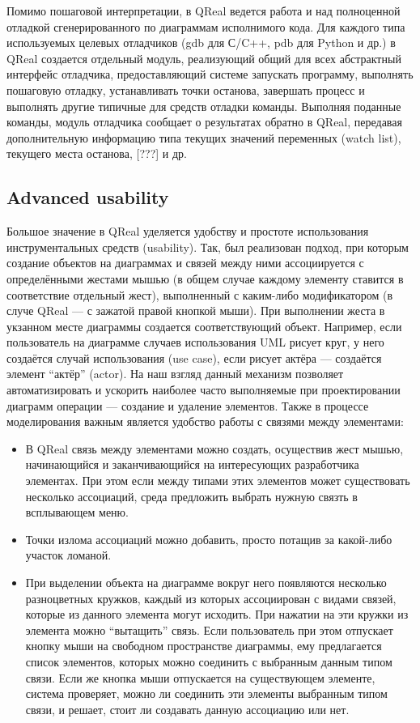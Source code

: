 \documentclass[a4paper]{article}
\begin{document}
Помимо пошаговой интерпретации, в QReal ведется работа и над полноценной отладкой сгенерированного по диаграммам исполнимого кода. Для каждого типа используемых целевых отладчиков (gdb для С/C++, pdb для Python и др.) в QReal создается отдельный модуль, реализующий общий для всех абстрактный интерфейс отладчика, предоставляющий системе запускать программу, выполнять пошаговую отладку, устанавливать точки останова, завершать процесс и выполнять другие типичные для средств отладки команды. Выполняя поданные команды, модуль отладчика сообщает о результатах обратно в QReal, передавая дополнительную информацию типа текущих значений переменных (watch list), текущего места останова, [???] и др. 
  
\subsection{Advanced usability}

Большое значение в QReal уделяется удобству и простоте использования инструментальных средств (usability). Так, был реализован подход, при которым создание объектов на диаграммах и связей между ними ассоциируется с определёнными жестами мышью (в общем случае каждому элементу ставится в соответствие отдельный жест), выполненный с каким-либо модификатором (в случе QReal --- с зажатой правой кнопкой мыши). При выполнении жеста в укзанном месте диаграммы создается соответствующий объект. Например, если пользователь на диаграмме случаев использования UML рисует круг, у него создаётся случай использования (use case), если рисует актёра --- создаётся элемент ``актёр'' (actor). На наш взгляд данный механизм позволяет автоматизировать и ускорить наиболее часто выполняемые при проектировании диаграмм операции --- создание и удаление элементов. Также в процессе моделирования важным является удобство работы с связями между элементами:
\begin{itemize} 
  \item В QReal связь между элементами можно создать, осуществив жест мышью, начинающийся и заканчивающийся на интересующих разработчика элементах. При этом если между типами этих элементов может существовать несколько ассоциаций, среда предложить выбрать нужную связть в всплывающем меню. 
  \item Точки излома ассоциаций можно добавить, просто потащив за какой-либо участок ломаной. 
  \item При выделении объекта на диаграмме вокруг него появляются несколько разноцветных кружков, каждый из которых ассоциирован с видами связей, которые из данного элемента могут исходить. При нажатии на эти кружки из элемента можно “вытащить” связь. Если пользователь при этом отпускает кнопку мыши на свободном пространстве диаграммы, ему предлагается список элементов, которых можно соединить с выбранным данным типом связи. Если же кнопка мыши отпускается на существующем элементе, система проверяет, можно ли соединить эти элементы выбранным типом связи, и решает, стоит ли создавать данную ассоциацию или нет. 
\end{itemize}
\end{document}
